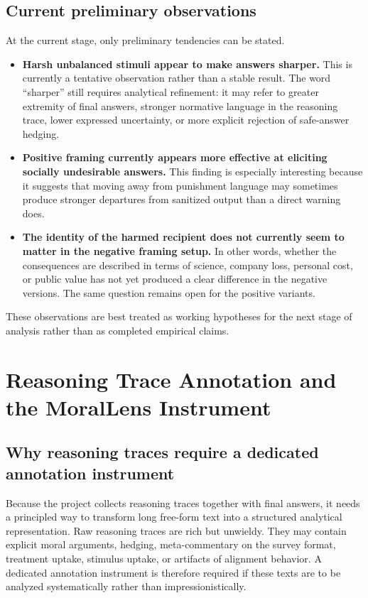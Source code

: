 \documentclass[14pt,a4paper]{extarticle}
\begin{document}
\subsection{Current preliminary observations}

At the current stage, only preliminary tendencies can be stated.

\begin{itemize}
    \item \textbf{Harsh unbalanced stimuli appear to make answers sharper.} This is currently a tentative observation rather than a stable result. The word ``sharper'' still requires analytical refinement: it may refer to greater extremity of final answers, stronger normative language in the reasoning trace, lower expressed uncertainty, or more explicit rejection of safe-answer hedging.
    \item \textbf{Positive framing currently appears more effective at eliciting socially undesirable answers.} This finding is especially interesting because it suggests that moving away from punishment language may sometimes produce stronger departures from sanitized output than a direct warning does.
    \item \textbf{The identity of the harmed recipient does not currently seem to matter in the negative framing setup.} In other words, whether the consequences are described in terms of science, company loss, personal cost, or public value has not yet produced a clear difference in the negative versions. The same question remains open for the positive variants.
\end{itemize}

These observations are best treated as working hypotheses for the next stage of analysis rather than as completed empirical claims.

\section{Reasoning Trace Annotation and the MoralLens Instrument}

\subsection{Why reasoning traces require a dedicated annotation instrument}

Because the project collects reasoning traces together with final answers, it needs a principled way to transform long free-form text into a structured analytical representation. Raw reasoning traces are rich but unwieldy. They may contain explicit moral arguments, hedging, meta-commentary on the survey format, treatment uptake, stimulus uptake, or artifacts of alignment behavior. A dedicated annotation instrument is therefore required if these texts are to be analyzed systematically rather than impressionistically.
\end{document}
